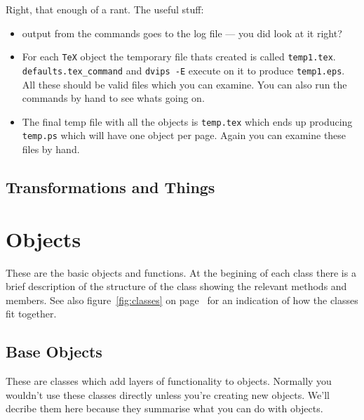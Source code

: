 \documentclass[a4paper]{book}
\begin{document}
Right, that enough of a rant. The useful stuff:
\begin{itemize}
\item output from the commands goes to the log file --- you did look
  at it right?
\item For each \Verb|TeX| object the temporary file thats created is
  called \Verb|temp1.tex|.  \Verb|defaults.tex_command| and
  \Verb|dvips -E| execute on it to produce \Verb|temp1.eps|. All these
  should be valid files which you can examine. You can also run the
  commands by hand to see whats going on.
\item The final temp file with all the objects is \Verb|temp.tex|
  which ends up producing \Verb|temp.ps| which will have one object
  per page. Again you can examine these files by hand.
\end{itemize}

\section{Transformations and Things}


\chapter{\pyscript Objects}
\label{cha:base-objects}

These are the basic \pyscript objects and functions. At the
begining of each class there is a brief description of the structure
of the class showing the relevant methods and members. See also
figure~\ref{fig:classes} on page~\pageref{fig:classes} for an
indication of how the classes fit together.

\section{Base Objects}

These are classes which add layers of functionality to \pyscript objects.
Normally you wouldn't use these classes directly unless you're creating new 
\pyscript objects. We'll decribe them here because they summarise what
you can do with \pyscript objects.

\end{document}
